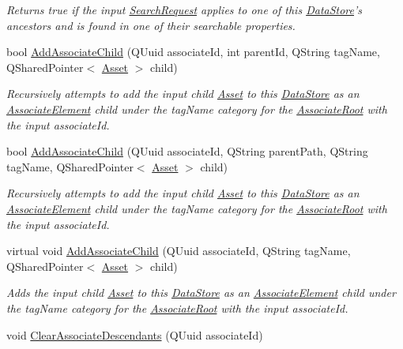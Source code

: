 \begin{DoxyCompactItemize}
\begin{DoxyCompactList}\small\item\em Returns true if the input \hyperlink{struct_search_request}{Search\-Request} applies to one of this \hyperlink{class_picto_1_1_data_store}{Data\-Store}'s ancestors and is found in one of their searchable properties. \end{DoxyCompactList}\item 
bool \hyperlink{class_picto_1_1_data_store_a2c5be0187543d41587e9dd0b8995ba78}{Add\-Associate\-Child} (Q\-Uuid associate\-Id, int parent\-Id, Q\-String tag\-Name, Q\-Shared\-Pointer$<$ \hyperlink{class_picto_1_1_asset}{Asset} $>$ child)
\begin{DoxyCompactList}\small\item\em Recursively attempts to add the input child \hyperlink{class_picto_1_1_asset}{Asset} to this \hyperlink{class_picto_1_1_data_store}{Data\-Store} as an \hyperlink{class_picto_1_1_associate_element}{Associate\-Element} child under the tag\-Name category for the \hyperlink{class_picto_1_1_associate_root}{Associate\-Root} with the input associate\-Id. \end{DoxyCompactList}\item 
bool \hyperlink{class_picto_1_1_data_store_a126a5560dd7a5a5128b46a77c90bc7eb}{Add\-Associate\-Child} (Q\-Uuid associate\-Id, Q\-String parent\-Path, Q\-String tag\-Name, Q\-Shared\-Pointer$<$ \hyperlink{class_picto_1_1_asset}{Asset} $>$ child)
\begin{DoxyCompactList}\small\item\em Recursively attempts to add the input child \hyperlink{class_picto_1_1_asset}{Asset} to this \hyperlink{class_picto_1_1_data_store}{Data\-Store} as an \hyperlink{class_picto_1_1_associate_element}{Associate\-Element} child under the tag\-Name category for the \hyperlink{class_picto_1_1_associate_root}{Associate\-Root} with the input associate\-Id. \end{DoxyCompactList}\item 
virtual void \hyperlink{class_picto_1_1_data_store_ac7c93b23e7eedc913701c183efb385da}{Add\-Associate\-Child} (Q\-Uuid associate\-Id, Q\-String tag\-Name, Q\-Shared\-Pointer$<$ \hyperlink{class_picto_1_1_asset}{Asset} $>$ child)
\begin{DoxyCompactList}\small\item\em Adds the input child \hyperlink{class_picto_1_1_asset}{Asset} to this \hyperlink{class_picto_1_1_data_store}{Data\-Store} as an \hyperlink{class_picto_1_1_associate_element}{Associate\-Element} child under the tag\-Name category for the \hyperlink{class_picto_1_1_associate_root}{Associate\-Root} with the input associate\-Id. \end{DoxyCompactList}\item 
\hypertarget{class_picto_1_1_data_store_a361492c6df108f1aeac4d981de847d40}{void \hyperlink{class_picto_1_1_data_store_a361492c6df108f1aeac4d981de847d40}{Clear\-Associate\-Descendants} (Q\-Uuid associate\-Id)}\label{class_picto_1_1_data_store_a361492c6df108f1aeac4d981de847d40}


\end{DoxyCompactItemize}
